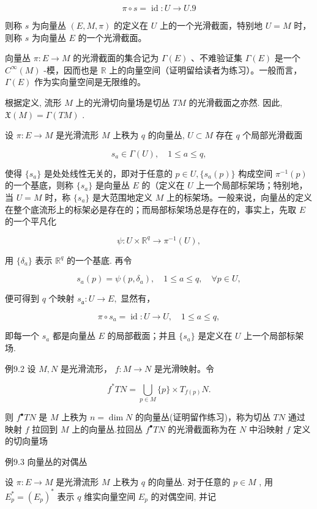 $$
\pi \circ s = \operatorname {i d}: U \rightarrow U.  {9}
$$

则称  $s$  为向量丛  $(E, M, \pi)$  的定义在  $U$  上的一个光滑截面，特别地  $U = M$  时，则称  $s$  为向量丛  $E$  的一个光滑截面。

向量丛  $\pi : E \to M$  的光滑截面的集合记为  $\Gamma(E)$ 、不难验证集  $\Gamma(E)$  是一个  $C^\infty(M)$ -模，因而也是  $\mathbb{R}$  上的向量空间（证明留给读者为练习）。一般而言， $\Gamma(E)$  作为实向量空间是无限维的。

根据定义, 流形  $M$  上的光滑切向量场是切丛  $TM$  的光滑截面之亦然. 因此,  $\mathfrak{X}(M) = \Gamma(TM)$ .

设  $\pi : E \to M$  是光滑流形  $M$  上秩为  $q$  的向量丛,  $U \subset M$  存在  $q$  个局部光滑截面

$$
s _ {a} \in \Gamma (U), \quad 1 \leqslant a \leqslant q,
$$

使得  $\{s_a\}$  是处处线性无关的，即对于任意的  $p \in U, \{s_a(p)\}$  构成空间  $\pi^{-1}(p)$  的一个基底，则称  $\{s_a\}$  是向量丛  $E$  的（定义在  $U$  上一个局部标架场；特别地，当  $U = M$  时，称  $\{s_a\}$  是大范围地定义  $M$  上的标架场。一般来说，向量丛的定义在整个底流形上的标架必是存在的；而局部标架场总是存在的，事实上，先取  $E$  的一个平凡化

$$
\psi : U \times \mathbb {R} ^ {q} \rightarrow \pi^ {- 1} (U),
$$

用  $\{\delta_{a}\}$  表示  $\mathbb{R}^q$  的一个基底. 再令

$$
s _ {a} (p) = \psi (p, \delta_ {a}), \quad 1 \leqslant a \leqslant q, \quad \forall p \in U,
$$

便可得到  $q$  个映射  $s_{\mathfrak{a}}:U\to E,$  显然有，

$$
\pi \circ s _ {a} = \operatorname {i d}: U \to U, \quad 1 \leqslant a \leqslant q,
$$

即每一个  $s_{a}$  都是向量丛  $E$  的局部截面；并且  $\{s_{a}\}$  是定义在  $U$  上一个局部标架场.

例9.2 设  $M, N$  是光滑流形， $f: M \to N$  是光滑映射。令

$$
f ^ {*} T N = \bigcup_ {p \in M} \{p \} \times T _ {f (p)} N.
$$

则  $f^{\bullet}TN$  是  $M$  上秩为  $n = \dim N$  的向量丛(证明留作练习)，称为切丛  $TN$  通过映射  $f$  拉回到  $M$  上的向量丛.拉回丛  $f^{\bullet}TN$  的光滑截面称为在  $N$  中沿映射  $f$  定义的切向量场

例9.3 向量丛的对偶丛

设  $\pi : E \to M$  是光滑流形  $M$  上秩为  $q$  的向量丛. 对于任意的  $p \in M$ , 用  $E_p^* = (E_p)^*$  表示  $q$  维实向量空间  $E_p$  的对偶空间, 并记

